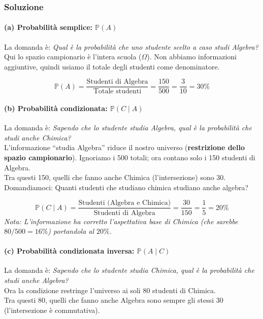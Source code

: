 \begin{esempio}
\begin{center}
\begin{tikzpicture}
\end{tikzpicture}
\end{center}

\subsubsection*{Soluzione}

\paragraph{(a) Probabilità semplice: $\mathbb{P}(A)$}
La domanda è: \emph{Qual è la probabilità che uno studente scelto a caso studi Algebra?}
\\Qui lo spazio campionario è l'intera scuola ($\Omega$). Non abbiamo informazioni aggiuntive, quindi usiamo il totale degli studenti come denominatore.

\[
\mathbb{P}(A) = \frac{\text{Studenti di Algebra}}{\text{Totale studenti}} = \frac{150}{500} = \frac{3}{10} = 30\%
\]

\paragraph{(b) Probabilità condizionata: $\mathbb{P}(C \mid A)$}
La domanda è: \emph{Sapendo che lo studente studia Algebra, qual è la probabilità che studi anche Chimica?}
\\L'informazione ``studia Algebra'' riduce il nostro universo (\textbf{restrizione dello spazio campionario}). Ignoriamo i 500 totali; ora contano solo i 150 studenti di Algebra.
\\Tra questi 150, quelli che fanno anche Chimica (l'intersezione) sono 30.
\\Domandiamoci: Quanti studenti che studiano chimica studiano anche algebra?

\[
\mathbb{P}(C \mid A) = \frac{\text{Studenti (Algebra e Chimica)}}{\text{Studenti di Algebra}} = \frac{30}{150} = \frac{1}{5} = 20\%
\]
\emph{Nota: L'informazione ha corretto l'aspettativa base di Chimica (che sarebbe $80/500 = 16\%$) portandola al $20\%$.}

\paragraph{(c) Probabilità condizionata inversa: $\mathbb{P}(A \mid C)$}
La domanda è: \emph{Sapendo che lo studente studia Chimica, qual è la probabilità che studi anche Algebra?}
\\Ora la condizione restringe l'universo ai soli 80 studenti di Chimica.
\\Tra questi 80, quelli che fanno anche Algebra sono sempre gli stessi 30 (l'intersezione è commutativa).


\end{esempio}

